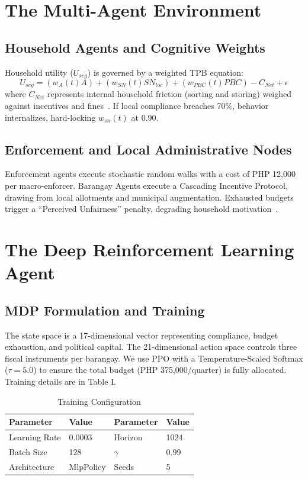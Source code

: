 \documentclass[journal,a4paper]{IEEEtran}
\begin{document}
\section{The Multi-Agent Environment}
\subsection{Household Agents and Cognitive Weights}
Household utility ($U_{seg}$) is governed by a weighted TPB equation:
\begin{equation}
U_{seg} = (w_{A}(t)A) + (w_{SN}(t)SN_{loc}) + (w_{PBC}(t)PBC) - C_{Net} + \epsilon
\end{equation}
where $C_{Net}$ represents internal household friction (sorting and storing) weighed against incentives and fines~\cite{zhao2022}. If local compliance breaches 70\%, behavior internalizes, hard-locking $w_{sn}(t)$ at 0.90.

\subsection{Enforcement and Local Administrative Nodes}
Enforcement agents execute stochastic random walks with a cost of PHP 12,000 per macro-enforcer. Barangay Agents execute a Cascading Incentive Protocol, drawing from local allotments and municipal augmentation. Exhausted budgets trigger a ``Perceived Unfairness'' penalty, degrading household motivation~\cite{moeini2023}.

\section{The Deep Reinforcement Learning Agent}
\subsection{MDP Formulation and Training}
The state space is a 17-dimensional vector representing compliance, budget exhaustion, and political capital. The 21-dimensional action space controls three fiscal instruments per barangay. We use PPO with a Temperature-Scaled Softmax ($\tau=5.0$) to ensure the total budget (PHP 375,000/quarter) is fully allocated. Training details are in Table I.

\begin{table}[ht]
\centering
\caption{Training Configuration}
\label{tab:hyperparameters}
\begin{tabular}{@{}ll|ll@{}}
\toprule
\textbf{Parameter} & \textbf{Value} & \textbf{Parameter} & \textbf{Value} \\ \midrule
Learning Rate & 0.0003 & Horizon & 1024 \\
Batch Size & 128 & $\gamma$ & 0.99 \\
Architecture & MlpPolicy & Seeds & 5 \\ \bottomrule
\end{tabular}
\end{table}
\end{document}
